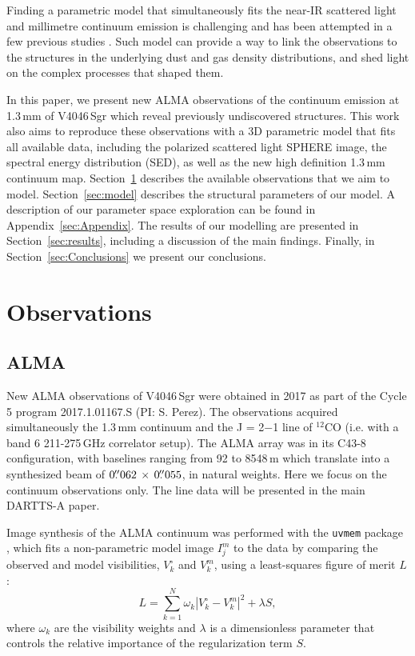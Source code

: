 \documentclass[fleqn,usenatbib,useAMS]{mnras}
\begin{document}
Finding a parametric model that simultaneously fits the near-IR scattered light and millimetre continuum emission is challenging and has been attempted in a few previous studies \citep[e.g.][]{Dong_2018,2019MNRAS.486..304B, Ru_z_Rodr_guez_2019}. Such model can provide a way to link the observations to the structures in the underlying dust and gas density distributions, and shed light on the complex processes that shaped them.

In this paper, we present new ALMA observations of the continuum emission at 1.3\,mm of V4046\,Sgr which reveal previously undiscovered structures. This work also aims to reproduce these observations with a 3D parametric model that fits all available data, including the polarized scattered light SPHERE image, the spectral energy distribution (SED), as well as the new high definition 1.3\,mm continuum map. Section~\ref{sec:Observations} describes the available observations that we aim to model. Section~\ref{sec:model} describes the structural parameters of our model. A description of our parameter space exploration can be found in Appendix~\ref{sec:Appendix}. The results of our modelling are presented in Section~\ref{sec:results}, including a discussion of the main findings. Finally, in Section~\ref{sec:Conclusions} we present our conclusions.

\section{Observations} \label{sec:Observations}
\subsection{ALMA}  \label{subsec:ALMA}

New ALMA observations of V4046\,Sgr were obtained in 2017 as part of the Cycle 5 program 2017.1.01167.S (PI: S. Perez). The observations acquired simultaneously the 1.3\,mm continuum and the J = 2$-$1 line of $^{12}$CO (i.e. with a band 6 211-275\,GHz correlator setup). The ALMA array was in its C43-8 configuration, with baselines ranging from 92 to 8548\,m which translate into a synthesized beam of $0\hbox{$.\!\!^{\prime\prime}$}062 \,\times \, 0\hbox{$.\!\!^{\prime\prime}$}055$, in natural weights. Here we focus on the continuum observations only. The line data will be presented in the main DARTTS-A paper.

Image synthesis of the ALMA continuum was performed with the {\tt uvmem} package \citep{2006ApJ...639..951C, 2018A&C....22...16C}, which fits a non-parametric model image $I^m_j$ to the data by comparing the observed and model visibilities, $V^\circ_k$ and $V^m_k$, using a least-squares figure of merit $L$:
\begin{equation}
  L = \sum_{k=1}^N \omega_k  |V^\circ_k - V^m_k|^2 + \lambda S,
\end{equation}
where $\omega_k$ are the visibility weights and $\lambda$ is a dimensionless parameter that controls the relative importance of the regularization term $S$.
\end{document}
